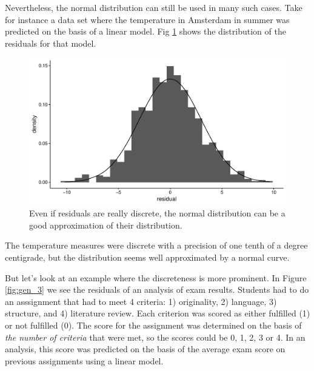\documentclass[]{book}\usepackage[]{graphicx}\usepackage[]{color}
\makeatletter
\def\maxwidth{ %
  \ifdim\Gin@nat@width>\linewidth
    \linewidth
  \else
    \Gin@nat@width
  \fi
}
\newenvironment{knitrout}{}{} %
\makeatother
\begin{document}
Nevertheless, the normal distribution can still be used in many such cases. Take for instance a data set where the temperature in Amsterdam in summer was predicted on the basis of a linear model. Fig \ref{fig:gen_2} shows the distribution of the residuals for that model.
% 
\begin{knitrout}
\color{fgcolor}\begin{figure}

{\centering \includegraphics[width=\maxwidth]{figure/gen_2-1} 

}

\caption[Even if residuals are really discrete, the normal distribution can be a good approximation of their distribution]{Even if residuals are really discrete, the normal distribution can be a good approximation of their distribution.}\label{fig:gen_2}
\end{figure}


\end{knitrout}


The temperature measures were discrete with a precision of one tenth of a degree centigrade, but the distribution seems well approximated by a normal curve.


But let's look at an example where the discreteness is more prominent. In Figure \ref{fig:gen_3} we see the residuals of an analysis of exam results. Students had to do an asssignment that had to meet 4 criteria: 1) originality, 2) language, 3) structure, and 4) literature review. Each criterion was scored as either fulfilled (1) or not fulfilled (0). The score for the assignment was determined on the basis of \textit{the number of criteria} that were met, so the scores could be 0, 1, 2, 3 or 4. In an analysis, this score was predicted on the basis of the average exam score on previous assignments using a linear model.
\end{document}
